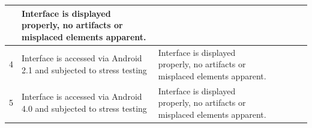 \documentclass[11pt]{article} %
\begin{document}
\begin{table}[h!]
\begin{tabular}{|c|p{3.5cm}|p{5.5cm}|c|c|c|c|c|}
  & Interface is displayed properly, no artifacts or misplaced \newline elements apparent.
  & & & &\multicolumn{2}{|c|}{}\\
\hline
4 & Interface is accessed via Android 2.1 and subjected to stress \newline testing 
  & Interface is displayed properly, no artifacts or misplaced \newline elements apparent. 
  & & & &\multicolumn{2}{|c|}{}\\
\hline
5 & Interface is accessed via Android 4.0 and subjected to stress \newline testing 
  & Interface is displayed properly, no artifacts or misplaced \newline elements apparent.
  & & & &\multicolumn{2}{|c|}{}\\
\hline
\end{tabular}
\end{table}
\clearpage
\end{document}
